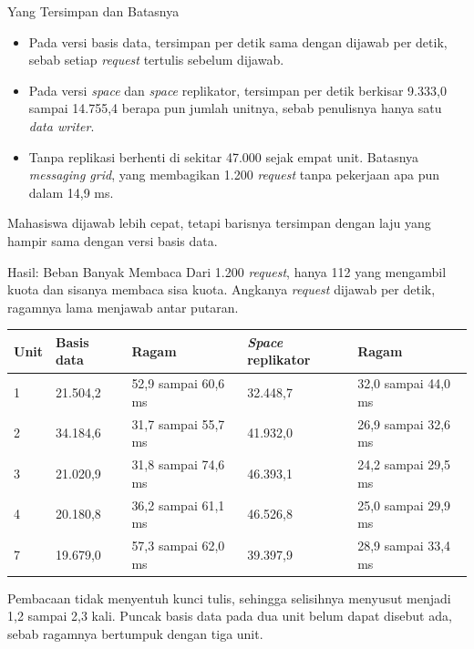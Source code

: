 \documentclass[aspectratio=169, table, 12pt]{beamer}
\begin{document}
\begin{frame}{{\Large Yang Tersimpan dan Batasnya}}
  \vspace{10pt}
  \begin{itemize}\small
    \item Pada versi basis data, tersimpan per detik sama dengan dijawab per
          detik, sebab setiap \textit{request} tertulis sebelum dijawab.
    \item Pada versi \textit{space} dan \textit{space} replikator, tersimpan per
          detik berkisar 9.333,0 sampai 14.755,4 berapa pun jumlah unitnya,
          sebab penulisnya hanya satu \textit{data writer}.
    \item Tanpa replikasi berhenti di sekitar 47.000 sejak empat unit. Batasnya
          \textit{messaging grid}, yang membagikan 1.200 \textit{request} tanpa
          pekerjaan apa pun dalam 14,9 ms.
  \end{itemize}

  \vspace{10pt}
  {\small Mahasiswa dijawab lebih cepat, tetapi barisnya tersimpan dengan laju
  yang hampir sama dengan versi basis data.}
\end{frame}

\begin{frame}{{\Large Hasil: Beban Banyak Membaca}}
  \vspace{4pt}
  {\small Dari 1.200 \textit{request}, hanya 112 yang mengambil kuota dan
  sisanya membaca sisa kuota. Angkanya \textit{request} dijawab per detik,
  ragamnya lama menjawab antar putaran.}

  \vspace{4pt}
  \centering
  \footnotesize
  \begin{tabularx}{0.96\textwidth}{|l|l|X|l|X|}
    \hline
    \textbf{Unit} & \textbf{Basis data} & \textbf{Ragam} & \textbf{\textit{Space} replikator} & \textbf{Ragam} \\
    \hline
    1 & 21.504,2 & 52,9 sampai 60,6 ms & 32.448,7 & 32,0 sampai 44,0 ms \\
    \hline
    2 & 34.184,6 & 31,7 sampai 55,7 ms & 41.932,0 & 26,9 sampai 32,6 ms \\
    \hline
    3 & 21.020,9 & 31,8 sampai 74,6 ms & 46.393,1 & 24,2 sampai 29,5 ms \\
    \hline
    4 & 20.180,8 & 36,2 sampai 61,1 ms & 46.526,8 & 25,0 sampai 29,9 ms \\
    \hline
    7 & 19.679,0 & 57,3 sampai 62,0 ms & 39.397,9 & 28,9 sampai 33,4 ms \\
    \hline
  \end{tabularx}

  \vspace{4pt}
  \raggedright
  {\small Pembacaan tidak menyentuh kunci tulis, sehingga selisihnya menyusut
  menjadi 1,2 sampai 2,3 kali. Puncak basis data pada dua unit belum dapat
  disebut ada, sebab ragamnya bertumpuk dengan tiga unit.}
\end{frame}
\end{document}
